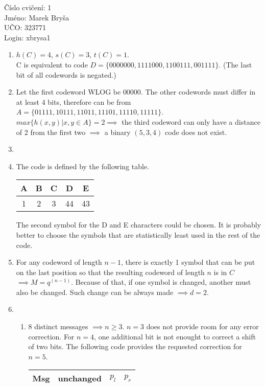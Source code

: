 \documentclass[a4paper,11pt]{article}
\begin{document}
\begin{flushleft}
Číslo cvičení: 1 \\ 
Jméno: Marek Bryša \\
UČO: 323771\\
Login: xbrysa1\\
\end{flushleft}
\begin{enumerate}
\item $h(C)=4$, $s(C)=3$, $t(C)=1$.\\C is equivalent to code $D=\{0000000,1111000,1100111,001111\}.$ (The last bit of all codewords is negated.)
\item Let the first codeword WLOG be $00000$. The other codewords must differ in at least 4 bits, therefore can be from $A=\{01111,10111,11011,11101,11110,11111\}$.\\$max\{h(x,y)| x,y\in A\}=2\implies$ the third codeword can only have a distance of 2 from the first two $\implies$ a binary $(5,3,4)$ code does not exist.
\item
\item The code is defined by the following table.
  \begin{center}
  \begin{tabular}{|c|c|c|c|c|}
    \hline
    A&B&C&D&E\\\hline
    1&2&3&44&43\\\hline
  \end{tabular}
  \end{center}
  The second symbol for the D and E characters could be chosen. It is probably better to choose the symbols that are statistically least used in the rest of the code.
\item For any codeword of length $n-1$, there is exactly 1 symbol that can be put on the last position so that the resulting codeword of length $n$ is in $C$ $\implies M=q^{(n-1)}$. Because of that, if one symbol is changed, another must also be changed. Such change can be always made $\implies  d=2$.
\item
  \begin{enumerate}
  \item 8 distinct messages $\implies n\geq 3$. $n=3$ does not provide room for any error correction. For $n=4$, one additional bit is not enought to correct a shift of two bits. The following code provides the requested correction for $n=5$.
  \begin{center}
  \begin{tabular}{|c|c|c|c|}
    \hline
    Msg & unchanged & $p_l$ & $p_r$ \\\hline

\end{tabular}
\end{center}
\end{enumerate}
\end{enumerate}
\end{document}

